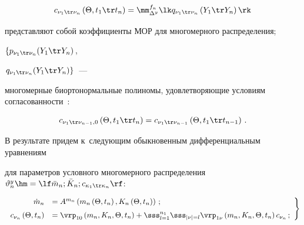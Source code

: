 \begin{equation*}

    c_{\nu_1\tr \nu_n} \left(\Theta, t_1\tr t_n\right) = 

    \mm_{\Delta^y}^{f_n} \lk q_{\nu_1\tr \nu_n} \left(Y_1 \tr Y_n\right)\rk


    \end{equation*}

представляют собой коэффициенты МОР для многомерного распределения; 

$\left\{ p_{\nu_1 \tr \nu_n} (Y_1 \tr Y_n)\right.$, 

$\left.q_{\nu_1 \tr \nu_n} (Y_1 \tr Y_n)\right\}$~--- 

многомерные биортонормальные полиномы, удовлетворяющие условиям согласованности~\cite{1-s2, 2-s2}:

    \begin{equation}

    c_{\nu_1 \tr \nu_{n-1}, 0} \left(\Theta, t_1\tr t_n\right) =

     c_{\nu_1\tr \nu_{n-1}} \left(\Theta, t_1\tr t_{n-1}\right)\,.

     \label{e6.3-s2}

     \end{equation}

В результате придем к~следующим обыкновенным дифференциальным уравнениям 

для параметров условного многомерного распределения $\vartheta_n^y \hm= \lf \bar m_n; 

\bar K_n ; c_{\kappa_1\tr \kappa_n}\rf$:

  \begin{equation}

  \left.

  \begin{array}{rl}

    \dot m_n &={A}^{m_n} \left(m_n \left(\Theta,t_n\right), K_n 

    \left(\Theta,t_n\right)\right)\,;\\[6pt] 

    c_{\nu_n} \left(\Theta, t_n\right) &=\vrp_{10} \left(m_n, K_n, \Theta, t_n\right)+ 

    \displaystyle \sss_{l=1}^{n_1} \sss_{|\nu | =l} \vrp_{1\nu} 

\left(m_n , K_n, \Theta, t_n\right) c_{\nu_n}\,;

\end{array}

\right\}

\label{e6.4-s2}

\end{equation}



